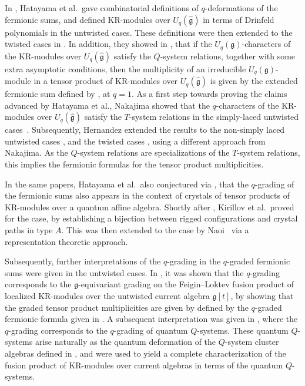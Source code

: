 \documentclass[10pt,a4paper]{amsart}
\numberwithin{equation}{section}
\begin{document}
In \cite{HKOTY99}, Hatayama et al.\ gave combinatorial definitions of $q$-deformations of the fermionic sums, and defined KR-modules over $U_q(\widehat{\mathfrak{g}})$ in terms of Drinfeld polynomials \cite{Chari01} in the untwisted cases. These definitions were then extended to the twisted cases in \cite{HKOTT02}. In addition, they showed in \cite[Theorem~8.1]{HKOTY99}, \cite[Theorem 6.3]{HKOTT02} that if the $U_q(\mathfrak{g})$-characters of the KR-modules over $U_q(\widehat{\mathfrak{g}})$ satisfy the $Q$-system relations, together with some extra asymptotic conditions, then the multiplicity of an irreducible $U_q(\mathfrak{g})$-module in a tensor product of KR-modules over $U_q(\widehat{\mathfrak{g}})$ is given by the extended fermionic sum defined by \cite[equation~(4.16)]{HKOTY99}, \cite[equation~(4.20)]{HKOTT02} at $q=1$. As a first step towards proving the claims advanced by Hatayama et al., Nakajima showed that the $q$-characters of the KR-modules over $U_q(\widehat{\mathfrak{g}})$ satisfy the $T$-system relations in the simply-laced untwisted cases~\cite{Nakajima03}. Subsequently, Hernandez extended the results to the non-simply laced untwisted cases \cite{Hernandez06}, and the twisted cases \cite{Hernandez10}, using a different approach from Nakajima. As the $Q$-system relations are specializations of the $T$-system relations, this implies the fermionic formulas for the tensor product multiplicities.

In the same papers, Hatayama et al.\ also conjectured via \cite[Conjecture~3.1]{HKOTY99}, \cite[Conjecture~3.10]{HKOTT02} that the $q$-grading of the fermionic sums also appears in the context of crystals of tensor products of KR-modules over a quantum affine algebra. Shortly after \cite{HKOTY99}, Kirillov et al.\ proved \cite[Conjecture~3.1]{HKOTY99} for the  case, by establishing a bijection between rigged configurations and crystal paths in type $A$. This was then extended to the  case by Naoi~\cite{Naoi12} via a representation theoretic approach.

Subsequently, further interpretations of the $q$-grading in the $q$-graded fermionic sums were given in the untwisted cases. In \cite{AK07, DFK08}, it was shown that the $q$-grading corresponds to the $\mathfrak{g}$-equivariant grading on the Feigin--Loktev fusion product \cite{FL99} of localized KR-modules over the untwisted current algebra $\mathfrak{g}[t]$, by showing that the graded tensor product multiplicities are given by defined by the $q$-graded fermionic formula given in \cite[equation~(4.3)]{HKOTY99}. A subsequent interpretation was given in \cite{DFK14, Lin21}, where the $q$-grading corresponds to the $q$-grading of quantum $Q$-systems. These quantum $Q$-systems arise naturally as the quantum deformation of the $Q$-system cluster algebras defined in \cite{DFK09, Kedem08}, and were used to yield a complete characterization of the fusion product of KR-modules over current algebras in terms of the quantum $Q$-systems.
\end{document}
